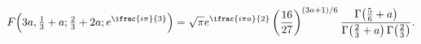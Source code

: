 \[\mathop{F\/}\nolimits\!\left(3a,\tfrac{1}{3}+a;\tfrac{2}{3}+2a;e^{\ifrac{i\pi}%
{3}}\right)=\sqrt{\pi}e^{\ifrac{i\pi a}{2}}\left(\frac{16}{27}\right)^{(3a+1)/%
6}\frac{\mathop{\Gamma\/}\nolimits\!\left(\frac{5}{6}+a\right)}{\mathop{\Gamma%
\/}\nolimits\!\left(\frac{2}{3}+a\right)\mathop{\Gamma\/}\nolimits\!\left(%
\frac{2}{3}\right)}.\]